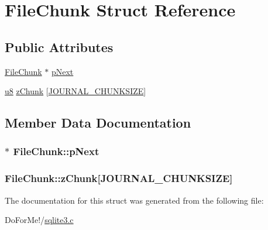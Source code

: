 \hypertarget{struct_file_chunk}{\section{File\-Chunk Struct Reference}
\label{struct_file_chunk}
}
\subsection*{Public Attributes}
\begin{DoxyCompactItemize}
\item 
\hyperlink{struct_file_chunk}{File\-Chunk} $\ast$ \hyperlink{struct_file_chunk_ad2d0d170afc7ce1e239e8716852e247b}{p\-Next}
\item 
\hyperlink{sqlite3_8c_a74a0f6424ae628af25f23f0a35f6ead3}{u8} \hyperlink{struct_file_chunk_ada06a9958ee6b82a6c2b15c29f847d19}{z\-Chunk} \mbox{[}\hyperlink{sqlite3_8c_ae74d0085c858ab7355c3c57fe295489f}{J\-O\-U\-R\-N\-A\-L\-\_\-\-C\-H\-U\-N\-K\-S\-I\-Z\-E}\mbox{]}
\end{DoxyCompactItemize}


\subsection{Member Data Documentation}
\hypertarget{struct_file_chunk_ad2d0d170afc7ce1e239e8716852e247b}{
\subsubsection[{p\-Next}]{$\ast$ File\-Chunk\-::p\-Next}}\label{struct_file_chunk_ad2d0d170afc7ce1e239e8716852e247b}
\hypertarget{struct_file_chunk_ada06a9958ee6b82a6c2b15c29f847d19}{
\subsubsection[{z\-Chunk}]{ File\-Chunk\-::z\-Chunk\mbox{[}{\bf J\-O\-U\-R\-N\-A\-L\-\_\-\-C\-H\-U\-N\-K\-S\-I\-Z\-E}\mbox{]}}}\label{struct_file_chunk_ada06a9958ee6b82a6c2b15c29f847d19}


The documentation for this struct was generated from the following file\-:\begin{DoxyCompactItemize}
\item 
Do\-For\-Me!/\hyperlink{sqlite3_8c}{sqlite3.\-c}\end{DoxyCompactItemize}
